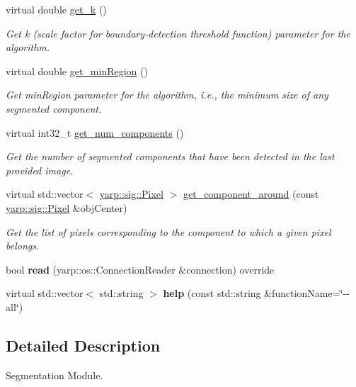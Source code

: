 \begin{DoxyCompactItemize}
virtual double \mbox{\hyperlink{classGBSegmModule_a44bab99aa7a035e57a185673c040d2f6}{get\+\_\+k}} ()
\begin{DoxyCompactList}\small\item\em Get k (scale factor for boundary-\/detection threshold function) parameter for the algorithm. \end{DoxyCompactList}\item 
virtual double \mbox{\hyperlink{classGBSegmModule_a2378b95e60b406a119947aa86b5bb9c4}{get\+\_\+min\+Region}} ()
\begin{DoxyCompactList}\small\item\em Get min\+Region parameter for the algorithm, i.\+e., the minimum size of any segmented component. \end{DoxyCompactList}\item 
virtual int32\+\_\+t \mbox{\hyperlink{classGBSegmModule_a655ee7c895eed07b07099133b9d8ce68}{get\+\_\+num\+\_\+components}} ()
\begin{DoxyCompactList}\small\item\em Get the number of segmented components that have been detected in the last provided image. \end{DoxyCompactList}\item 
virtual std\+::vector$<$ \mbox{\hyperlink{classyarp_1_1sig_1_1Pixel}{yarp\+::sig\+::\+Pixel}} $>$ \mbox{\hyperlink{classGBSegmModule_a0b63c53513e67c4f126e29cf7f28ad53}{get\+\_\+component\+\_\+around}} (const \mbox{\hyperlink{classyarp_1_1sig_1_1Pixel}{yarp\+::sig\+::\+Pixel}} \&obj\+Center)
\begin{DoxyCompactList}\small\item\em Get the list of pixels corresponding to the component to which a given pixel belongs. \end{DoxyCompactList}\item 
\mbox{\label{classyarp_1_1sig_1_1SegmentationModuleInterface_a31d3ce62c3ad4ab669216a19cde4e769}} 
bool {\bfseries read} (yarp\+::os\+::\+Connection\+Reader \&connection) override
\item 
\mbox{\label{classyarp_1_1sig_1_1SegmentationModuleInterface_a14ea1dff9efc91a5099633740b3e45f9}} 
virtual std\+::vector$<$ std\+::string $>$ {\bfseries help} (const std\+::string \&function\+Name=\char`\"{}-\/-\/all\char`\"{})
\end{DoxyCompactItemize}


\subsection{Detailed Description}
Segmentation Module. 



